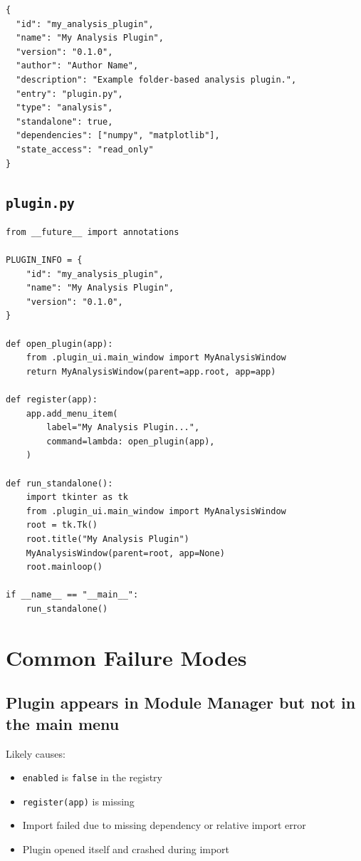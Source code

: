 \documentclass[11pt, a4paper]{article}
\begin{document}
\begin{lstlisting}[style=json]
{
  "id": "my_analysis_plugin",
  "name": "My Analysis Plugin",
  "version": "0.1.0",
  "author": "Author Name",
  "description": "Example folder-based analysis plugin.",
  "entry": "plugin.py",
  "type": "analysis",
  "standalone": true,
  "dependencies": ["numpy", "matplotlib"],
  "state_access": "read_only"
}
\end{lstlisting}

\subsection{\texttt{plugin.py}}

\begin{lstlisting}[style=python]
from __future__ import annotations

PLUGIN_INFO = {
    "id": "my_analysis_plugin",
    "name": "My Analysis Plugin",
    "version": "0.1.0",
}

def open_plugin(app):
    from .plugin_ui.main_window import MyAnalysisWindow
    return MyAnalysisWindow(parent=app.root, app=app)

def register(app):
    app.add_menu_item(
        label="My Analysis Plugin...",
        command=lambda: open_plugin(app),
    )

def run_standalone():
    import tkinter as tk
    from .plugin_ui.main_window import MyAnalysisWindow
    root = tk.Tk()
    root.title("My Analysis Plugin")
    MyAnalysisWindow(parent=root, app=None)
    root.mainloop()

if __name__ == "__main__":
    run_standalone()
\end{lstlisting}

\section{Common Failure Modes}

\subsection{Plugin appears in Module Manager but not in the main menu}

Likely causes:

\begin{itemize}
  \item \texttt{enabled} is \texttt{false} in the registry
  \item \texttt{register(app)} is missing
  \item Import failed due to missing dependency or relative import error
  \item Plugin opened itself and crashed during import
\end{itemize}
\end{document}
